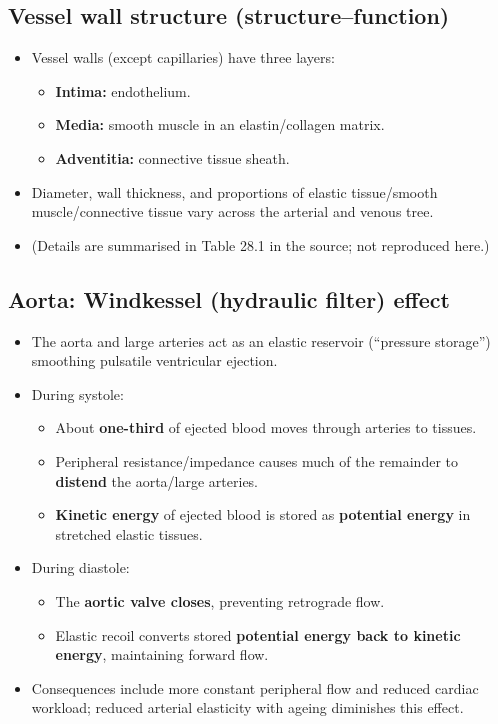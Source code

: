 \documentclass[11pt,a4paper]{article}
\begin{document}
\subsection{Vessel wall structure (structure--function)}
\begin{itemize}
\item Vessel walls (except capillaries) have three layers:
  \begin{itemize}
  \item \textbf{Intima:} endothelium.
  \item \textbf{Media:} smooth muscle in an elastin/collagen matrix.
  \item \textbf{Adventitia:} connective tissue sheath.
  \end{itemize}
\item Diameter, wall thickness, and proportions of elastic tissue/smooth muscle/connective tissue vary across the arterial and venous tree.
\item (Details are summarised in Table 28.1 in the source; not reproduced here.)
\end{itemize}

\subsection{Aorta: Windkessel (hydraulic filter) effect}
\begin{itemize}
\item The aorta and large arteries act as an elastic reservoir (``pressure storage'') smoothing pulsatile ventricular ejection.
\item During systole:
  \begin{itemize}
  \item About \textbf{one-third} of ejected blood moves through arteries to tissues.
  \item Peripheral resistance/impedance causes much of the remainder to \textbf{distend} the aorta/large arteries.
  \item \textbf{Kinetic energy} of ejected blood is stored as \textbf{potential energy} in stretched elastic tissues.
  \end{itemize}
\item During diastole:
  \begin{itemize}
  \item The \textbf{aortic valve closes}, preventing retrograde flow.
  \item Elastic recoil converts stored \textbf{potential energy back to kinetic energy}, maintaining forward flow.
  \end{itemize}
\item Consequences include more constant peripheral flow and reduced cardiac workload; reduced arterial elasticity with ageing diminishes this effect.
\end{itemize}
\end{document}
